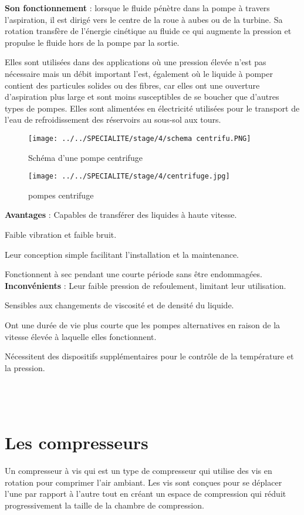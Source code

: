 \documentclass[20pt,a4paper]{report}
\begin{document}
\begin{large}
\textbf{Son fonctionnement} : lorsque le fluide pénètre dans la pompe à travers l’aspiration, il est dirigé vers le centre de la roue à aubes ou de la turbine. Sa rotation transfère de l’énergie cinétique au fluide ce qui augmente la pression et propulse le fluide hors de la pompe par la sortie.

Elles sont utilisées dans des applications où une pression élevée n’est pas nécessaire mais un débit important l’est, également où le liquide à pomper contient des particules solides ou des fibres, car elles ont une ouverture d’aspiration plus large et sont moins susceptibles de se boucher que d’autres types de pompes.
Elles sont alimentées en électricité utilisées pour le transport de l’eau de refroidissement des réservoirs au sous-sol aux tours.
       
 \begin{figure}[!h]
 \centering
 \texttt{[image: ../../SPECIALITE/stage/4/schema centrifu.PNG]}
 \caption{Schéma d'une pompe centrifuge
 }
 \end{figure}
 
 
					\begin{figure}[!h]
					\caption{pompes centrifuge}
					\centering
					\texttt{[image: ../../SPECIALITE/stage/4/centrifuge.jpg]}
					\end{figure}
					
				\textbf{Avantages} :
	Capables de transférer des liquides à haute vitesse.
	
	Faible vibration et faible bruit.
	
	Leur conception simple facilitant l’installation et la maintenance.
	
	Fonctionnent à sec pendant une courte période sans être endommagées.
\textbf{Inconvénients} :
	Leur faible pression de refoulement, limitant leur utilisation.
	
	Sensibles aux changements de viscosité et de densité du liquide.
	
	Ont une durée de vie plus courte que les pompes alternatives en raison de la vitesse élevée à laquelle elles fonctionnent.
	
	Nécessitent des dispositifs supplémentaires pour le contrôle de la température et la pression.
\\
\\
\\
\\
		\section{Les compresseurs}
Un compresseur à vis qui est un type de compresseur qui utilise des vis en rotation pour comprimer l’air ambiant. Les vis sont conçues pour se déplacer l’une par rapport à l’autre tout en créant un espace de compression qui réduit progressivement la taille de la chambre de compression.


\end{large}
\end{document}
